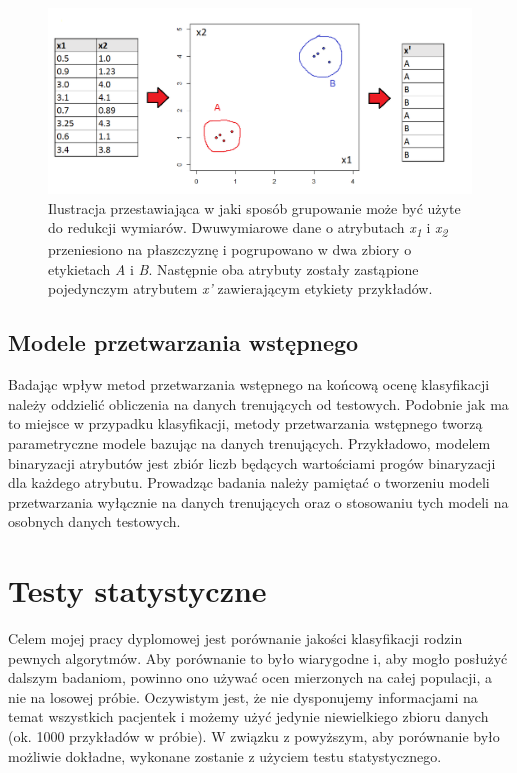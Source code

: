 \documentclass[../thesis.tex]{subfiles}
\begin{document}
\begin{figure}[h]
\centering
\includegraphics[height=.25\textheight]{grouping.png}
\caption{Ilustracja przestawiająca w jaki sposób grupowanie może być użyte do redukcji wymiarów. Dwuwymiarowe dane o atrybutach \emph{x\textsubscript{1}} i \emph{x\textsubscript{2}} przeniesiono na płaszczyznę i pogrupowano w dwa zbiory o etykietach \emph{A} i \emph{B}. Następnie oba atrybuty zostały zastąpione pojedynczym atrybutem \emph{x'} zawierającym etykiety przykładów. }
\label{classification:grouping}
\end{figure}

\subsection{Modele przetwarzania wstępnego}

Badając wpływ metod przetwarzania wstępnego na końcową ocenę klasyfikacji należy oddzielić obliczenia na danych trenujących od testowych. Podobnie jak ma to miejsce w przypadku klasyfikacji, metody przetwarzania wstępnego tworzą parametryczne modele bazując na danych trenujących. Przykładowo, modelem binaryzacji atrybutów jest zbiór liczb będących wartościami progów binaryzacji dla każdego atrybutu. Prowadząc badania należy pamiętać o tworzeniu modeli przetwarzania wyłącznie na danych trenujących oraz o stosowaniu tych modeli na osobnych danych testowych.

\section{Testy statystyczne}

Celem mojej pracy dyplomowej jest porównanie jakości klasyfikacji rodzin pewnych algorytmów. Aby porównanie to było wiarygodne i, aby mogło posłużyć dalszym badaniom, powinno ono używać ocen mierzonych na całej populacji, a nie na losowej próbie. Oczywistym jest, że nie dysponujemy informacjami na temat wszystkich pacjentek i możemy użyć jedynie niewielkiego zbioru danych (ok. 1000 przykładów w próbie). W związku z powyższym, aby porównanie było możliwie dokładne, wykonane zostanie z użyciem testu statystycznego.
\end{document}
